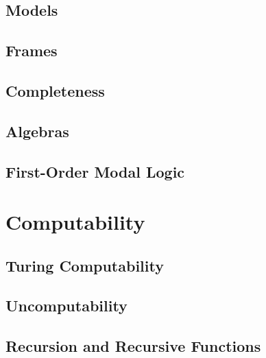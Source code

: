 \documentclass[12pt, a4paper, twoside, openright, titlepage]{book}
\begin{document}
\chapter{\textsection\textsection Models}


\chapter{\textsection\textsection Frames}


\chapter{\textsection\textsection Completeness}


\chapter{\textsection\textsection Algebras}


\chapter{\textsection\textsection First-Order Modal Logic}





\part{Computability}


\chapter{\textsection\textsection Turing Computability}


\chapter{\textsection\textsection Uncomputability}



\chapter{\textsection\textsection Recursion and Recursive Functions}
\end{document}
